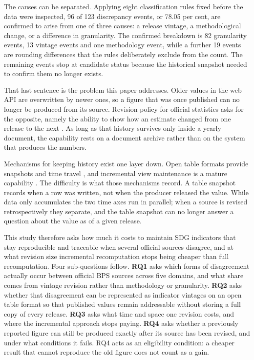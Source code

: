 \documentclass[a4paper,fleqn]{cas-dc}
\begin{document}
The causes can be separated. Applying eight classification rules fixed before
the data were inspected, 96 of 123 discrepancy events, or 78.05 per cent, are
confirmed to arise from one of three causes: a release vintage, a methodological
change, or a difference in granularity. The confirmed breakdown is 82
granularity events, 13 vintage events and one methodology event, while a further
19 events are rounding differences that the rules deliberately exclude from the
count. The remaining events stop at candidate status because the historical
snapshot needed to confirm them no longer exists.

That last sentence is the problem this paper addresses. Older values in the web
API are overwritten by newer ones, so a figure that was once published can no
longer be produced from its source. Revision policy for official statistics asks
for the opposite, namely the ability to show how an estimate changed from one
release to the next \citep{oecd_eurostat_revisions}. As long as that history
survives only inside a yearly document, the capability rests on a document
archive rather than on the system that produces the numbers.

Mechanisms for keeping history exist one layer down. Open table formats provide
snapshots and time travel \citep{iceberg_spec}, and incremental view maintenance
is a mature capability \citep{fabric_mlv}. The difficulty is what those
mechanisms record. A table snapshot records when a row was written, not when the
producer released the value. While data only accumulates the two time axes run
in parallel; when a source is revised retrospectively they separate, and the
table snapshot can no longer answer a question about the value as of a given
release.

This study therefore asks how much it costs to maintain SDG indicators that stay
reproducible and traceable when several official sources disagree, and at what
revision size incremental recomputation stops being cheaper than full
recomputation. Four sub-questions follow. \textbf{RQ1} asks which forms of
disagreement actually occur between official BPS sources across five domains,
and what share comes from vintage revision rather than methodology or
granularity. \textbf{RQ2} asks whether that disagreement can be represented as
indicator vintages on an open table format so that published values remain
addressable without storing a full copy of every release. \textbf{RQ3} asks what
time and space one revision costs, and where the incremental approach stops
paying. \textbf{RQ4} asks whether a previously reported figure can still be
produced exactly after its source has been revised, and under what conditions it
fails. RQ4 acts as an eligibility condition: a cheaper result that cannot
reproduce the old figure does not count as a gain.
\end{document}
